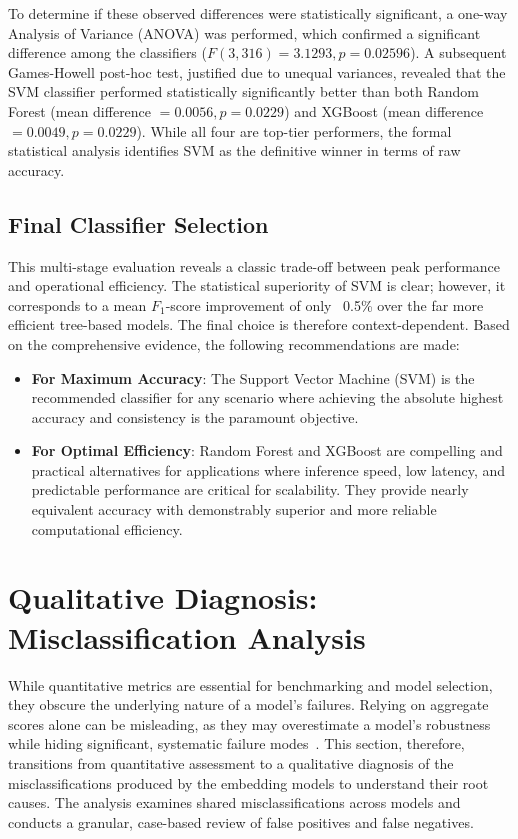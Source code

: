 To determine if these observed differences were statistically significant, a one-way Analysis of Variance (ANOVA) was performed, which confirmed a significant difference among the classifiers (\(F(3, 316) = 3.1293, p = 0.02596\)). A subsequent Games-Howell post-hoc test, justified due to unequal variances, revealed that the SVM classifier performed statistically significantly better than both Random Forest (mean difference \(= 0.0056, p=0.0229\)) and XGBoost (mean difference \(= 0.0049, p=0.0229\)). While all four are top-tier performers, the formal statistical analysis identifies SVM as the definitive winner in terms of raw accuracy.

\subsection{Final Classifier Selection}\label{ch:4.5.4}
This multi-stage evaluation reveals a classic trade-off between peak performance and operational efficiency. The statistical superiority of SVM is clear; however, it corresponds to a mean \(F_1\)-score improvement of only ~0.5\% over the far more efficient tree-based models. The final choice is therefore context-dependent. Based on the comprehensive evidence, the following recommendations are made:
\begin{itemize}
    \item \textbf{For Maximum Accuracy}: The Support Vector Machine (SVM) is the recommended classifier for any scenario where achieving the absolute highest accuracy and consistency is the paramount objective.
    \item \textbf{For Optimal Efficiency}: Random Forest and XGBoost are compelling and practical alternatives for applications where inference speed, low latency, and predictable performance are critical for scalability. They provide nearly equivalent accuracy with demonstrably superior and more reliable computational efficiency.
\end{itemize}

\section{Qualitative Diagnosis: Misclassification Analysis}\label{ch:4.6}
While quantitative metrics are essential for benchmarking and model selection, they obscure the underlying nature of a model's failures. Relying on aggregate scores alone can be misleading, as they may overestimate a model's robustness while hiding significant, systematic failure modes~\cite{gauthier2022}. This section, therefore, transitions from quantitative assessment to a qualitative diagnosis of the misclassifications produced by the embedding models to understand their root causes. The analysis examines shared misclassifications across models and conducts a granular, case-based review of false positives and false negatives.

